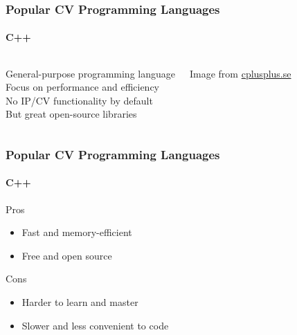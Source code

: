 \documentclass[xetex,professionalfont]{beamer}
\begin{document}

\begin{frame}
\frametitle{Popular CV Programming Languages}
\framesubtitle{C++}

\begin{columns}

General-purpose programming language\\
Focus on performance and efficiency\\
No IP/CV functionality by default\\
But great open-source libraries


\begin{center}
{
	{\centering Image from \url{cplusplus.se}}}
\end{center}

\end{columns}

\end{frame}


\begin{frame}
\frametitle{Popular CV Programming Languages}
\framesubtitle{C++}

Pros
\begin{itemize}
	\item Fast and memory-efficient
	\item Free and open source
\end{itemize}

\medskip
Cons
\begin{itemize}
	\item Harder to learn and master
	\item Slower and less convenient to code
\end{itemize}

\end{frame}

\end{document}
